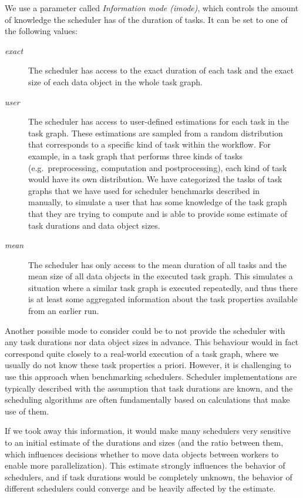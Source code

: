 \begin{description}
		We use a parameter called \emph{Information mode (imode)}, which controls the amount of knowledge the
		scheduler has of the duration of tasks. It can be set to one of the following values:
		\begin{description}
			\item[\emph{exact}] The scheduler has access to the exact duration of each task and the exact size of each data object
				in the whole task graph.
			\item[\emph{user}] The scheduler has access to user-defined estimations for each task in the task graph. These
				estimations are sampled from a random distribution that corresponds to a specific kind of task
				within the workflow. For example, in a task graph that performs three kinds of tasks (e.g.\
				preprocessing, computation and postprocessing), each kind of task would have its own distribution.
				We have categorized the tasks of task graphs that we have used for scheduler benchmarks described
				in~\Autoref{sec:estee-benchmarks} manually, to simulate a user that has some knowledge of the task graph
				that they are trying to compute and is able to provide some estimate of task durations and data
				object sizes.
			\item[\emph{mean}] The scheduler has only access to the mean duration of all tasks and the mean size of all data
				objects in the executed task graph. This simulates a situation where a similar task graph is
				executed repeatedly, and thus there is at least some aggregated information about the task
				properties available from an earlier run.
		\end{description}
		Another possible mode to consider could be to not provide the scheduler with any task durations nor
		data object sizes in advance. This behaviour would in fact correspond quite closely to a real-world
		execution of a task graph, where we usually do not know these task properties a priori. However, it
		is challenging to use this approach when benchmarking schedulers. Scheduler implementations are
		typically described with the assumption that task durations are known, and the scheduling
		algorithms are often fundamentally based on calculations that make use of them.

		If we took away this information, it would make many schedulers very sensitive to an initial
		estimate of the durations and sizes (and the ratio between them, which influences decisions whether
		to move data objects between workers to enable more parallelization). This estimate strongly
		influences the behavior of schedulers, and if task durations would be completely unknown, the
		behavior of different schedulers could converge and be heavily affected by the estimate.


\end{description}
